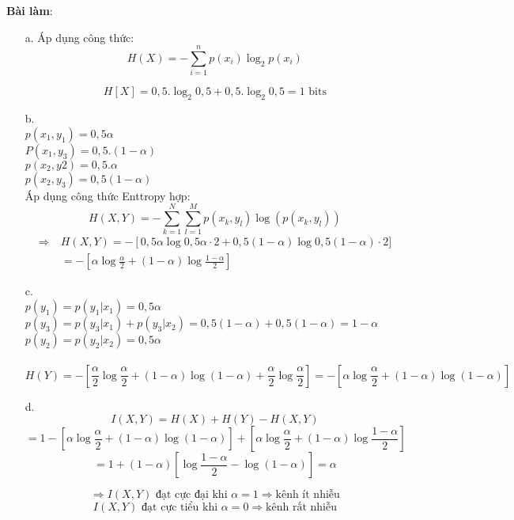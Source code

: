 \documentclass[12pt]{article}
\begin{document}
\textbf{Bài làm}: 
\\
\begin{itemize}
    \item [a.] Áp dụng công thức: \[H(X) = -\sum_{i=1}^{n} p(x_i) \log_2 p(x_i)\]
    
    \[H[X] = 0,5.\log_2 0,5 + 0,5.\log_2 0,5 = \text{1 bits} \]
    \item [b. ]\\
    $p(x_1, y_1) = 0,5\alpha$\\
    $P(x_1, y_3) = 0,5.(1-\alpha)$\\
    $p(x_2, y2) = 0,5.\alpha$\\
    $p(x_2, y_3) = 0,5(1-\alpha)$\\
    Áp dụng công thức Enttropy hợp: 
    \[
    H(X, Y) = - \sum_{k=1}^{N} \sum_{l=1}^{M} p(x_k, y_l) \log \left( p(x_k, y_l) \right)
    \]
     \[
    \begin{aligned}
    \Rightarrow\ &H(X,Y) = -\left[ 0{,}5\alpha \log 0{,}5\alpha\cdot 2 + 0{,}5(1 - \alpha) \log 0{,}5(1 - \alpha) \right.\cdot 2] \\
    &= -\left[ \alpha \log \frac{\alpha}{2} + (1 - \alpha) \log \frac{1 - \alpha}{2} \right]
    \end{aligned}
    \]
    \item[c.]\\
     $p(y_1) = p(y_1|x_1) = 0{,}5\alpha$ \\
    $p(y_3) = p(y_3|x_1) + p(y_3|x_2) = 0{,}5(1 - \alpha) + 0{,}5(1 - \alpha) = 1 - \alpha$ \\
    $p(y_2) = p(y_2|x_2) = 0{,}5\alpha$ \\
    \\
    \[
    H(Y) = -\left[ \frac{\alpha}{2} \log \frac{\alpha}{2} + (1 - \alpha) \log (1 - \alpha) + \frac{\alpha}{2} \log \frac{\alpha}{2} \right] 
    = -\left[ \alpha \log \frac{\alpha}{2} + (1 - \alpha) \log (1 - \alpha) \right]
    \]
    \item[d. ] 
    \\
    \[
    I(X, Y) = H(X) + H(Y) - H(X, Y)
    \]
    \[
    = 1 - \left[ \alpha \log \frac{\alpha}{2} + (1 - \alpha) \log (1 - \alpha) \right] + \left[ \alpha \log \frac{\alpha}{2} + (1 - \alpha) \log \frac{1 - \alpha}{2} \right]
    \]
    \[
    = 1 + (1 - \alpha) \left[ \log \frac{1 - \alpha}{2} - \log (1 - \alpha) \right]
    = \alpha
    \]
    
    \[
    \Rightarrow I(X, Y) \text{ đạt cực đại khi } \alpha = 1 \Rightarrow \text{kênh ít nhiễu}
    \]
    \[
    I(X, Y) \text{ đạt cực tiểu khi } \alpha = 0 \Rightarrow \text{kênh rất nhiễu}
    \]

    


    

    
    
\end{itemize}
    
\end{document}
